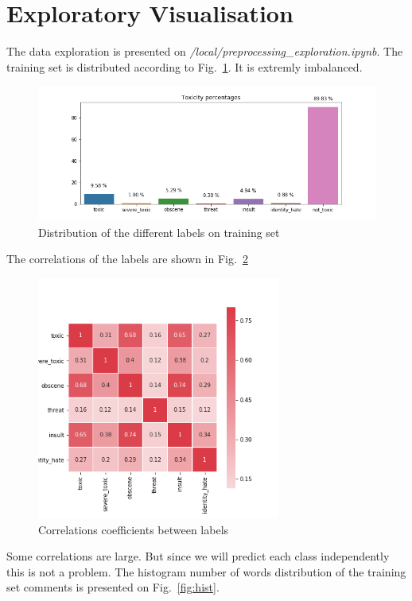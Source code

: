 \documentclass{report}
\begin{document}
\section{Exploratory Visualisation}


The data exploration is presented on \emph{/local/preprocessing\_exploration.ipynb}. 
The training set is distributed according to Fig.~\ref{fig:bar_plot}. It is extremly imbalanced. 
\begin{figure}[!h]
  \includegraphics[width=\textwidth]{../local/plots_tables/bar_plot.png}
  \caption{Distribution of the different labels on training set}
  \label{fig:bar_plot}
\end{figure}
The correlations of the labels are shown in Fig.~\ref{fig:corr}
\begin{figure}[!h]
\centering
  \includegraphics[width=80mm]{../local/plots_tables/corr.png}
  \caption{Correlations coefficients between labels}
  \label{fig:corr}
\end{figure}
Some correlations are large. But since we will predict each class independently this is not a problem. The histogram number of words distribution of the training set comments is presented on Fig.~\ref{fig:hist}. 
\end{document}
